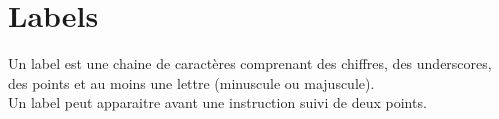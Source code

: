 \documentclass[a4paper]{article}
\begin{document}
    \section{Labels}
    Un label est une chaine de caractères comprenant des chiffres, 
    des underscores, des points et au moins une lettre (minuscule ou majuscule).\\
    Un label peut apparaitre avant une instruction suivi de deux points.
\end{document}
